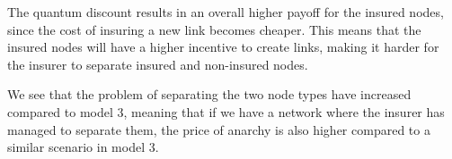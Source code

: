 The quantum discount results in an overall higher payoff for the insured nodes, since the cost of insuring a new link becomes cheaper. This means that the insured nodes will have a higher incentive to create links, making it harder for the insurer to separate insured and non-insured nodes.

We see that the problem of separating the two node types have increased compared to model 3, meaning that if we have a network where the insurer has managed to separate them, the price of anarchy is also higher compared to a similar scenario in model 3. 







